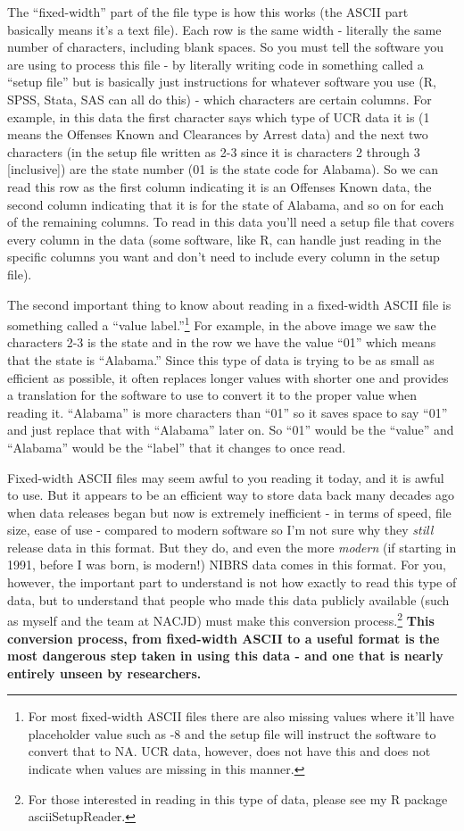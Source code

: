 \documentclass[
  12pt,
  openany]{book}
\begin{document}
The ``fixed-width'' part of the file type is how this works (the ASCII part basically means it's a text file). Each row is the same width - literally the same number of characters, including blank spaces. So you must tell the software you are using to process this file - by literally writing code in something called a ``setup file'' but is basically just instructions for whatever software you use (R, SPSS, Stata, SAS can all do this) - which characters are certain columns. For example, in this data the first character says which type of UCR data it is (1 means the Offenses Known and Clearances by Arrest data) and the next two characters (in the setup file written as 2-3 since it is characters 2 through 3 {[}inclusive{]}) are the state number (01 is the state code for Alabama). So we can read this row as the first column indicating it is an Offenses Known data, the second column indicating that it is for the state of Alabama, and so on for each of the remaining columns. To read in this data you'll need a setup file that covers every column in the data (some software, like R, can handle just reading in the specific columns you want and don't need to include every column in the setup file).

The second important thing to know about reading in a fixed-width ASCII file is something called a ``value label.''\footnote{For most fixed-width ASCII files there are also missing values where it'll have placeholder value such as -8 and the setup file will instruct the software to convert that to NA. UCR data, however, does not have this and does not indicate when values are missing in this manner.} For example, in the above image we saw the characters 2-3 is the state and in the row we have the value ``01'' which means that the state is ``Alabama.'' Since this type of data is trying to be as small as efficient as possible, it often replaces longer values with shorter one and provides a translation for the software to use to convert it to the proper value when reading it. ``Alabama'' is more characters than ``01'' so it saves space to say ``01'' and just replace that with ``Alabama'' later on. So ``01'' would be the ``value'' and ``Alabama'' would be the ``label'' that it changes to once read.

Fixed-width ASCII files may seem awful to you reading it today, and it is awful to use. But it appears to be an efficient way to store data back many decades ago when data releases began but now is extremely inefficient - in terms of speed, file size, ease of use - compared to modern software so I'm not sure why they \emph{still} release data in this format. But they do, and even the more \emph{modern} (if starting in 1991, before I was born, is modern!) NIBRS data comes in this format. For you, however, the important part to understand is not how exactly to read this type of data, but to understand that people who made this data publicly available (such as myself and the team at NACJD) must make this conversion process.\footnote{For those interested in reading in this type of data, please see my R package asciiSetupReader.} \textbf{This conversion process, from fixed-width ASCII to a useful format is the most dangerous step taken in using this data - and one that is nearly entirely unseen by researchers.}
\end{document}

